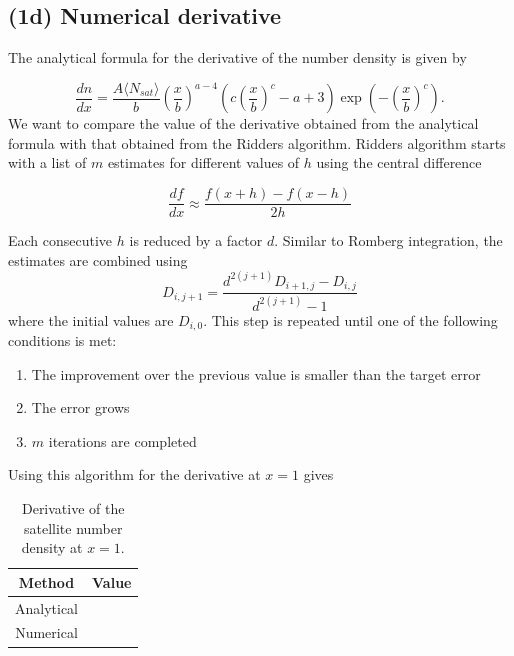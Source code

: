 \documentclass{article}
\newcommand{\CodeDir}{Code}
\newcommand{\CalcDir}{Calculations}
\begin{document}


\subsection{(1d) Numerical derivative}
The analytical formula for the derivative of the number density is given by

\begin{equation}
 \frac{dn}{dx}=\frac{A \langle N_{sat}\rangle}{b}
  \left(\frac{x}{b}\right)^{a - 4}
  \left( c \left(\frac{x}{b}\right)^c - a + 3 \right)
  \exp\left(-\left(\frac{x}{b}\right)^c\right).
\end{equation}
We want to compare the value of the derivative obtained from the analytical formula with that obtained from the Ridders algorithm. Ridders algorithm starts with a list of $m$ estimates for different values of $h$ using the central difference 

\begin{equation}
    \frac{df}{dx}\approx\frac{f(x+h)-f(x-h)}{2h}
\end{equation}

Each consecutive $h$ is reduced by a factor $d$. Similar to Romberg integration, the estimates are combined using
\begin{equation}
    D_{i,j+1}=\frac{d^{2(j+1)}{D_{i+1, j}-D_{i,j}}}{d^{2(j+1)}-1}
\end{equation}
where the initial values are $D_{i,0}$. This step is repeated until one of the following conditions is met:
\begin{enumerate}
    \item The improvement over the previous value is smaller than the target error
    \item The error grows
    \item $m$ iterations are completed
\end{enumerate}
Using this algorithm for the derivative at $x=1$ gives

\begin{table}[H]
\centering
\caption{Derivative of the satellite number density at \(x=1\).}
\begin{tabular}{|c|c|}
\hline
Method & Value \\
\hline
Analytical &  \\
Numerical &  \\
\hline
\end{tabular}
\end{table}
\end{document}
